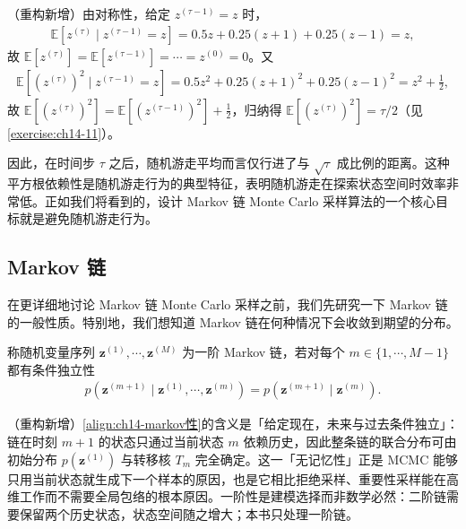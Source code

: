 \documentclass[../../main.tex]{subfiles}
\begin{document}
\begin{solution}（重构新增）由对称性，给定 $z^{(\tau-1)}=z$ 时，
\begin{align*}
\mathbb{E}\left[z^{(\tau)}\mid z^{(\tau-1)}=z\right]=0.5z+0.25(z+1)+0.25(z-1)=z,
\end{align*}
故 $\mathbb{E}\left[z^{(\tau)}\right]=\mathbb{E}\left[z^{(\tau-1)}\right]=\cdots=z^{(0)}=0$。又
\begin{align*}
\mathbb{E}\left[\left(z^{(\tau)}\right)^{2}\mid z^{(\tau-1)}=z\right]=0.5z^{2}+0.25(z+1)^{2}+0.25(z-1)^{2}=z^{2}+\frac{1}{2},
\end{align*}
故 $\mathbb{E}\left[\left(z^{(\tau)}\right)^{2}\right]=\mathbb{E}\left[\left(z^{(\tau-1)}\right)^{2}\right]+\frac{1}{2}$，归纳得 $\mathbb{E}\left[\left(z^{(\tau)}\right)^{2}\right]=\tau/2$（见\cref{exercise:ch14-11}）。
\end{solution}

因此，在时间步 $\tau$ 之后，随机游走平均而言仅行进了与 $\sqrt{\tau}$ 成比例的距离。这种平方根依赖性是随机游走行为的典型特征，表明随机游走在探索状态空间时效率非常低。正如我们将看到的，设计 Markov 链 Monte Carlo 采样算法的一个核心目标就是避免随机游走行为。

\subsection{Markov 链}\label{subsection:ch14-markov链}

在更详细地讨论 Markov 链 Monte Carlo 采样之前，我们先研究一下 Markov 链的一般性质。特别地，我们想知道 Markov 链在何种情况下会收敛到期望的分布。

\begin{definition}[一阶 Markov 链]\label{definition:ch14-markov链}
称随机变量序列 $\bm{z}^{(1)},\cdots,\bm{z}^{(M)}$ 为一阶 Markov 链，若对每个 $m\in\{1,\cdots,M-1\}$ 都有条件独立性
\begin{align}
p\!\left(\bm{z}^{(m+1)}\mid\bm{z}^{(1)},\cdots,\bm{z}^{(m)}\right)=p\!\left(\bm{z}^{(m+1)}\mid\bm{z}^{(m)}\right).
\label{align:ch14-markov性}
\end{align}
\end{definition}

\begin{remark}（重构新增）\eqref{align:ch14-markov性}的含义是「给定现在，未来与过去条件独立」：链在时刻 $m+1$ 的状态只通过当前状态 $m$ 依赖历史，因此整条链的联合分布可由初始分布 $p\!\left(\bm{z}^{(1)}\right)$ 与转移核 $T_{m}$ 完全确定。这一「无记忆性」正是 MCMC 能够只用当前状态就生成下一个样本的原因，也是它相比拒绝采样、重要性采样能在高维工作而不需要全局包络的根本原因。一阶性是建模选择而非数学必然：二阶链需要保留两个历史状态，状态空间随之增大；本书只处理一阶链。
\end{remark}
\end{document}
